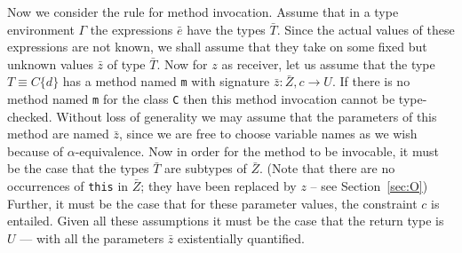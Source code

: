 \documentclass[preprint,nocopyrightspace,9pt]{sigplanconf}
\begin{document}
Now we consider the rule for method invocation. Assume that in a type
environment $\Gamma$ the expressions $\bar{e}$ have the types
$\bar{T}$. Since the actual values of these expressions are not known,
we shall assume that they take on some fixed but unknown values
$\bar{z}$ of type $\bar{T}$.  Now for $z$ as receiver, let us assume
that the type $T\equiv C\{d\}$ has a method named {\tt m} with
signature $\bar{z}: \bar{Z}, c \rightarrow U$.  If there is no method
named {\tt m} for the class {\tt C} then this method invocation cannot
be type-checked. Without loss of generality we may assume that the
parameters of this method are named $\bar{z}$, since we are free to
choose variable names as we wish because of $\alpha$-equivalence. Now
in order for the method to be invocable, it must be the case that the
types $\bar{T}$ are subtypes of $\bar{Z}$. (Note that there are no
occurrences of {\tt this} in $\bar{Z}$; they have been replaced by
$z$ -- see Section~\ref{sec:O}) Further, it must be the case that for these parameter values,
the constraint $c$ is entailed. Given all these assumptions it must be
the case that the return type is $U$ --- with all the parameters
$\bar{z}$ existentially quantified.
\end{document}
